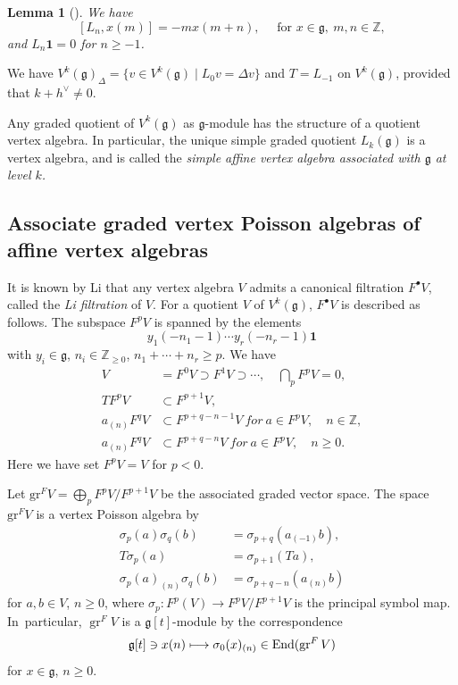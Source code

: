\documentclass[11pt]{article}
\newcommand{\Subsection}{\subsection}
\numberwithin{equation}{section}
\let\oldvee\vee
\renewcommand{\vee}{{\scriptscriptstyle\oldvee}}
\newcommand{\sbullet}{{\scriptscriptstyle\bullet}}
\newcommand\mto{\mathchoice{\longmapsto}{\mapsto}{\mapsto}{\mapsto}}
\let\on\operatorname
\newcommand\Z{{\mathbb Z}}
\DeclareMathOperator{\End}{End}
\newcommand \g{\mathfrak g}
\newcommand \frg{\widehat{\mathfrak{g}}}
\newtheorem{lem}[theorem]{Lemma}
\theoremstyle{definition}
\begin{document}
\begin{lem}[{\cite{Kac_infinite}}]
\label{lem:sugawara-vs-g}
We have
\[
[L_n,x(m)]= - m x(m+n), \quad
\text{ for }x\in \g,\ m,n\in \Z,
\]
and $L_n\mathbf{1}=0$ for $n\geq -1$.
\end{lem}
We have
$V^k(\g) _{\Delta}=\{v\in V^k(\g)\mid L_0 v=\Delta v\}$
and $T=L_{-1}$ on $V^k(\g)$, provided that $k+h^{\vee}\ne 0$.

Any
graded quotient of $V^k(\g)$
as $\frg$-module
has the structure of a quotient vertex algebra.
In particular,
the unique simple graded quotient $L_k(\g)$
is a vertex algebra,
and is called the \emph{simple affine vertex algebra associated with $\g$ at level $k$.}

\Subsection{Associate graded vertex Poisson algebras of affine vertex algebras}
It is known by Li \cite{Li05}
that any vertex algebra $V$ admits a canonical filtration $F^\sbullet V$,
called the \emph{Li filtration} of $V$.
For a quotient $V$ of $V^k(\g)$,
$F^\sbullet V$ is described as follows.
The subspace
$F^p V$ is spanned by the elements
\[
y_{1}(-n_1-1)\cdots y_{r}(-n_r-1)\mathbf{1}
\]
with $y_{i} \in \g$,
$n_i\in\Z_{\geq 0}$, $ n_1+\cdots +n_r\geq p$.
We have
\begin{equation}
\label{eq:translation}
\begin{aligned}
V&=F^0V\supset F^1V\supset\cdots, \quad \textstyle\bigcap_{p}F^pV=0,\\ 
TF^pV&\subset F^{p+1}V,\\
a_{(n)}F^{q}V&\subset F^{p+q-n-1}V \ for \ a\in F^{p}V, \quad n\in\Z,\\
a_{(n)}F^{q}V&\subset F^{p+q-n}V \ for \ a\in F^{p}V, \quad n\geq 0.
\end{aligned}
\end{equation}
Here we have set $F^pV=V$ for $p<0$.

Let $\mathrm{gr}^FV=\bigoplus_p F^pV/F^{p+1}V$ be the associated graded vector space.
The space $\mathrm{gr}^FV$ is a vertex Poisson algebra by
\begin{align*}
\sigma_{p}(a)\sigma_{q}(b)&=\sigma_{p+q}(a_{(-1)}b),\\
T\sigma_{p}(a)&=\sigma_{p+1}(Ta),\\
\sigma_{p}(a)_{(n)}\sigma_{q}(b)&=\sigma_{p+q- n}(a_{(n)}b)
\end{align*}
for $a,b\in V$,
$n\geq 0$,
where $\sigma_p \colon F^p(V)\to F^pV/F^{p+1}V$ is the principal symbol map.
In~particular,
$\on{gr}^F V$ is a $\g[t]$-module by the correspondence
\begin{equation}
\g[t]\ni x(n)\mto \sigma_0(x)_{(n)}\in \End(\on{gr}^F V)
\label{eq:g[t]-action-in-gr}
\end{equation}
for $x\in \g$, $n\geq 0$.
\end{document}
